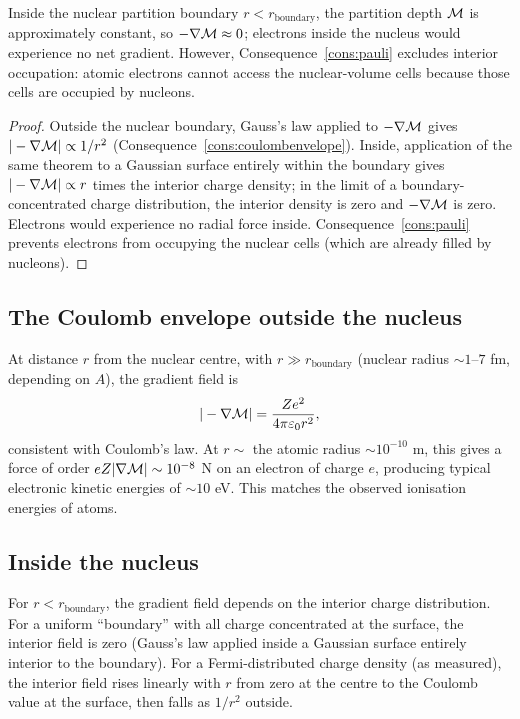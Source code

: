 \begin{proposition}
\label{prop:interiordepth}
Inside the nuclear partition boundary $r<r_{\text{boundary}}$, the partition depth $\mathcal{M}$ is approximately constant, so $-\nabla\mathcal{M}\approx 0$; electrons inside the nucleus would experience no net gradient. However, Consequence~\ref{cons:pauli} excludes interior occupation: atomic electrons cannot access the nuclear-volume cells because those cells are occupied by nucleons.
\end{proposition}

\begin{proof}
Outside the nuclear boundary, Gauss's law applied to $-\nabla\mathcal{M}$ gives $|-\nabla\mathcal{M}|\propto 1/r^{2}$ (Consequence~\ref{cons:coulombenvelope}). Inside, application of the same theorem to a Gaussian surface entirely within the boundary gives $|-\nabla\mathcal{M}|\propto r$ times the interior charge density; in the limit of a boundary-concentrated charge distribution, the interior density is zero and $-\nabla\mathcal{M}$ is zero. Electrons would experience no radial force inside. Consequence~\ref{cons:pauli} prevents electrons from occupying the nuclear cells (which are already filled by nucleons).
\end{proof}

\subsection{The Coulomb envelope outside the nucleus}

At distance $r$ from the nuclear centre, with $r\gg r_{\text{boundary}}$ (nuclear radius $\sim 1$--$7$ fm, depending on $A$), the gradient field is
\begin{equation}
|-\nabla\mathcal{M}|=\frac{Ze^{2}}{4\pi\varepsilon_{0}r^{2}},
\end{equation}
consistent with Coulomb's law. At $r\sim$ the atomic radius $\sim 10^{-10}$ m, this gives a force of order $eZ|\nabla\mathcal{M}|\sim 10^{-8}$ N on an electron of charge $e$, producing typical electronic kinetic energies of $\sim 10$ eV. This matches the observed ionisation energies of atoms.

\subsection{Inside the nucleus}

For $r<r_{\text{boundary}}$, the gradient field depends on the interior charge distribution. For a uniform ``boundary'' with all charge concentrated at the surface, the interior field is zero (Gauss's law applied inside a Gaussian surface entirely interior to the boundary). For a Fermi-distributed charge density (as measured), the interior field rises linearly with $r$ from zero at the centre to the Coulomb value at the surface, then falls as $1/r^{2}$ outside.

